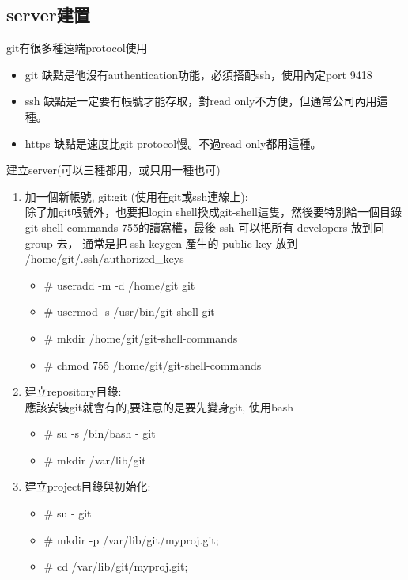   \subsection{server建置}
  git有很多種遠端protocol使用
  \begin{itemize}
    \item git 缺點是他沒有authentication功能，必須搭配ssh，使用內定port 9418
    \item ssh 缺點是一定要有帳號才能存取，對read only不方便，但通常公司內用這種。
    \item https 缺點是速度比git protocol慢。不過read only都用這種。
  \end{itemize}
  建立server(可以三種都用，或只用一種也可)
  \begin{enumerate}
    \item 加一個新帳號, git:git (使用在git或ssh連線上):\\
      除了加git帳號外，也要把login shell換成git-shell這隻，然後要特別給一個目錄
      git-shell-commands 755的讀寫權，最後 ssh 可以把所有 developers 放到同 
      group 去， 通常是把 ssh-keygen 產生的 public key 放到
      /home/git/.ssh/authorized\_keys
      \begin{itemize}
        \item \# useradd -m -d /home/git git
        \item \# usermod -s /usr/bin/git-shell git
        \item \# mkdir /home/git/git-shell-commands
        \item \# chmod 755 /home/git/git-shell-commands
      \end{itemize}
    \item 建立repository目錄:\\
      應該安裝git就會有的,要注意的是要先變身git, 使用bash\\
      \begin{itemize}
        \item \# su -s /bin/bash - git \\
        \item \# mkdir /var/lib/git
      \end{itemize}
    \item 建立project目錄與初始化:\\
      \begin{itemize}
        \item \# su - git
        \item \# mkdir -p /var/lib/git/myproj.git;
        \item \# cd /var/lib/git/myproj.git;

\end{itemize}
\end{enumerate}
